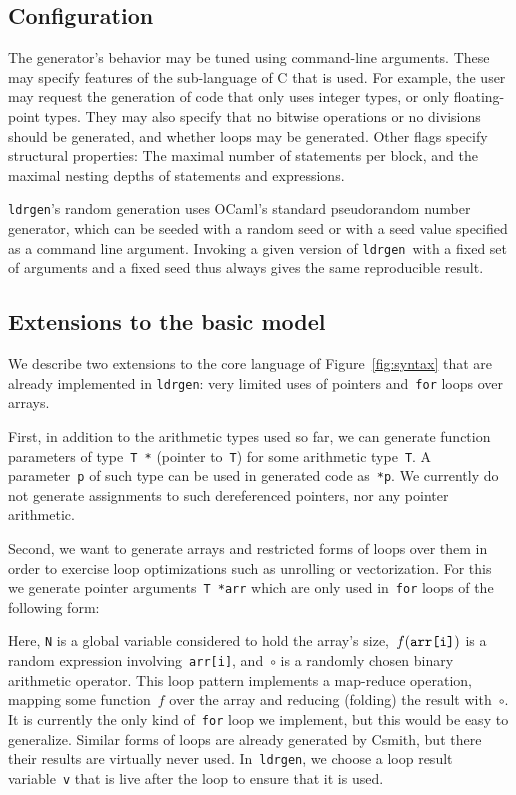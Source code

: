 \documentclass[a4paper]{easychair}
\newcommand\ldrgen{\texttt{ldrgen}}
\begin{document}
\subsection{Configuration}

The generator's behavior may be tuned using command-line arguments. These
may specify features of the sub-language of C that is used. For example, the
user may request the generation of code that only uses integer types, or
only floating-point types. They may also specify that no bitwise operations
or no divisions should be generated, and whether loops may be generated.
Other flags specify structural properties: The maximal number of statements
per block, and the maximal nesting depths of statements and expressions.

\ldrgen's random generation uses OCaml's standard pseudorandom number
generator, which can be seeded with a random seed or with a seed value
specified as a command line argument. Invoking a given version of \ldrgen\
with a fixed set of arguments and a fixed seed thus always gives the same
reproducible result.

\subsection{Extensions to the basic model}

We describe two extensions to the core language of Figure~\ref{fig:syntax}
that are already implemented in \ldrgen: very limited uses of pointers
and~\verb|for| loops over arrays.

First, in addition to the arithmetic types used so far, we can generate
function parameters of type~\verb|T *| (pointer to~\verb|T|) for some
arithmetic type~\verb|T|. A parameter~\verb|p| of such type can be used in
generated code as~\verb|*p|. We currently do not generate assignments to
such dereferenced pointers, nor any pointer arithmetic.

Second, we want to generate arrays and restricted forms of loops over them
in order to exercise loop optimizations such as unrolling or vectorization.
For this we generate pointer arguments~\verb|T *arr| which are only
used in~\verb|for| loops of the following form:


Here, \verb|N| is a global variable considered to hold the array's
size,~\(f(\mbox{\texttt{arr[i]}})\) is a random expression
involving~\verb|arr[i]|, and~\(\circ\) is a randomly chosen binary
arithmetic operator. This loop pattern implements a map-reduce operation,
mapping some function~\(f\) over the array and reducing (folding) the result
with~\(\circ\). It is currently the only kind of~\verb|for| loop we
implement, but this would be easy to generalize.
%
Similar forms of loops are already generated by Csmith, but there their
results are virtually never used. In~\ldrgen, we choose a loop result
variable~\verb|v| that is live after the loop to ensure that it is used.
\end{document}
